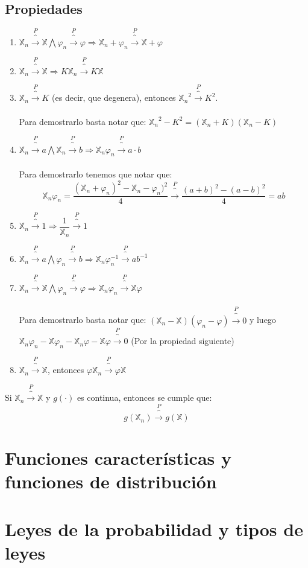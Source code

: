 \documentclass[12pt,a4paper]{book}
\begin{document}
\subsection{Propiedades}
\begin{enumerate}
\item $\mathbb{X}_n\overbrace{\longrightarrow}^P \mathbb{X} \bigwedge \varphi_n\overbrace{\longrightarrow}^P \varphi \Longrightarrow \mathbb{X}_n + \varphi_n\overbrace{\longrightarrow}^P\mathbb{X}+\varphi$
\item $\mathbb{X}_n\overbrace{\longrightarrow}^P \mathbb{X}\Longrightarrow K\mathbb{X}_n\overbrace{\longrightarrow}^P K\mathbb{X}$
\item $\mathbb{X}_n\overbrace{\longrightarrow}^P K$ (es decir, que degenera), entonces ${\mathbb{X}_n}^2\overbrace{\longrightarrow}^P K^2$.\\\\
Para demostrarlo basta notar que: ${\mathbb{X}_n}^2-K^2=(\mathbb{X}_n + K)(\mathbb{X}_n -K)$
\item $\mathbb{X}_n\overbrace{\longrightarrow}^P a \bigwedge \mathbb{X}_n\overbrace{\longrightarrow}^P b\Longrightarrow \mathbb{X}_n \mathbb{\varphi}_n \overbrace{\longrightarrow}^P a\cdot b$
\\\\
Para demostrarlo tenemos que notar que: 
$$\mathbb{X}_n\varphi_n=\dfrac{(\mathbb{X}_n + \varphi_n)^2-\mathbb{X}_n - \varphi_n)^2}{4}\overbrace{\longrightarrow}^P \dfrac{(a+b)^2-(a-b)^2}{4}=ab$$
\item $\mathbb{X}_n\overbrace{\longrightarrow}^P 1 \Longrightarrow \dfrac{1}{\mathbb{X}_n}\overbrace{\longrightarrow}^P 1$
\item $\mathbb{X}_n\overbrace{\longrightarrow}^P a \bigwedge \varphi_n\overbrace{\longrightarrow}^P b\Longrightarrow \mathbb{X}_n\varphi_n^{-1}\overbrace{\longrightarrow}^P ab^{-1}$
\item $\mathbb{X}_n\overbrace{\longrightarrow}^P \mathbb{X}\bigwedge \varphi_n\overbrace{\longrightarrow}^P \varphi \Longrightarrow\mathbb{X}_n\varphi_n\overbrace{\longrightarrow}^P\mathbb{X}\varphi$
\\\\
Para demostrarlo basta notar que: $(\mathbb{X}_n - \mathbb{X})(\varphi_n - \varphi)\overbrace{\longrightarrow}^P 0$ y luego $\mathbb{X}_n\varphi_n-\mathbb{X}\varphi_n-\mathbb{X}_n\varphi-\mathbb{X}\varphi\overbrace{\longrightarrow}^P 0$ (Por la propiedad siguiente)
\item $\mathbb{X}_n\overbrace{\longrightarrow}^P \mathbb{X}$, entonces $\varphi\mathbb{X}_n\overbrace{\longrightarrow}^P \varphi\mathbb{X}$
\end{enumerate}
\begin{theorem}
Si $\mathbb{X}_n\overbrace{\longrightarrow}^P \mathbb{X}$ y $g(\cdot)$ es continua, entonces se cumple que:
$$g(\mathbb{X}_n)\overbrace{\longrightarrow}^P g(\mathbb{X})$$
\end{theorem}
\section{Funciones características y funciones de distribución}
\section{Leyes de la probabilidad y tipos de leyes}
\end{document}
